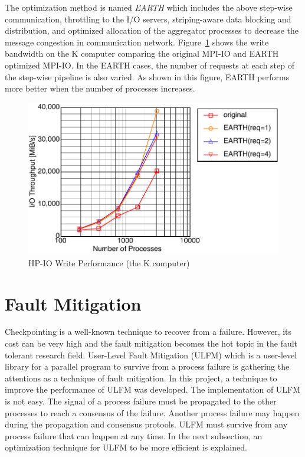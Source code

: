 The optimization method is named {\em EARTH} which includes the above
step-wise communication, throttling to the I/O servers,
striping-aware data blocking and distribution, and 
optimized allocation of the aggregator processes to decrease the message
congestion in communication network. Figure~\ref{fig:earth} shows the
write bandwidth on the K computer comparing the original MPI-IO and
EARTH optimized MPI-IO. In the EARTH cases, the number of requests at
each step of the step-wise pipeline is also varied. As shown in this
figure, EARTH performs more better when the number of processes
increases. 

\begin{figure}[ht]
\begin{center}
\includegraphics[width=0.95\columnwidth]{Figs/K-HPIO.pdf}
  \caption{HP-IO Write Performance (the K computer)}
  \label{fig:earth}
\end{center}
\end{figure}

\section{Fault Mitigation}

Checkpointing is a well-known technique to recover from a
failure. However, its cost can be very high and the fault mitigation
becomes the hot topic in the fault tolerant research field. User-Level
Fault Mitigation (ULFM) which is a user-level 
library for a parallel program to survive from a process failure is
gathering the attentions as a technique of fault mitigation. In this
project, a technique to improve the performance of ULFM was developed.
The implementation of ULFM is not easy. The signal of a process
failure must be propagated to the other processes to reach a consensus
of the failure. Another process failure may happen during the
propagation and consensus protools. ULFM must survive from any
process failure that can happen at any time. In the next subsection,
an optimization technique for ULFM to be more efficient is explained. 

